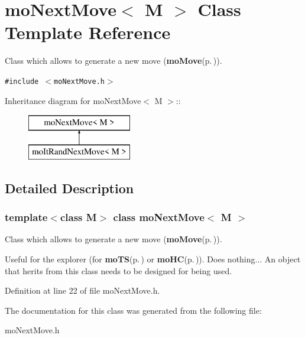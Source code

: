 \section{mo\-Next\-Move$<$ M $>$ Class Template Reference}
\label{classmo_next_move}
Class which allows to generate a new move ({\bf mo\-Move}{\rm (p.\,\pageref{classmo_move})}).  


{\tt \#include $<$mo\-Next\-Move.h$>$}

Inheritance diagram for mo\-Next\-Move$<$ M $>$::\begin{figure}[H]
\begin{center}
\leavevmode
\includegraphics[height=2cm]{classmo_next_move}
\end{center}
\end{figure}


\subsection{Detailed Description}
\subsubsection*{template$<$class M$>$ class mo\-Next\-Move$<$ M $>$}

Class which allows to generate a new move ({\bf mo\-Move}{\rm (p.\,\pageref{classmo_move})}). 

Useful for the explorer (for {\bf mo\-TS}{\rm (p.\,\pageref{classmo_t_s})} or {\bf mo\-HC}{\rm (p.\,\pageref{classmo_h_c})}). Does nothing... An object that herits from this class needs to be designed for being used. 



Definition at line 22 of file mo\-Next\-Move.h.

The documentation for this class was generated from the following file:\begin{CompactItemize}
\item 
mo\-Next\-Move.h\end{CompactItemize}
